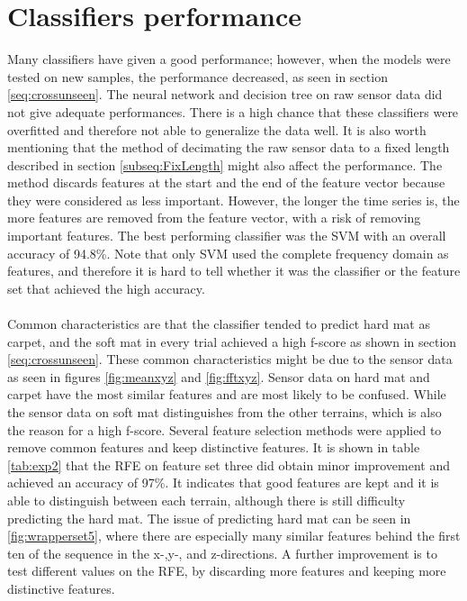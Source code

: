 \documentclass[USenglish]{ifimaster}  %
\begin{document}
\section{Classifiers performance}
Many classifiers have given a good performance; however, when the models were tested on new samples, the performance decreased, as seen in section \ref{seq:crossunseen}. The neural network and decision tree on raw sensor data did not give adequate performances. There is a high chance that these classifiers were overfitted and therefore not able to generalize the data well. It is also worth mentioning that the method of decimating the raw sensor data to a fixed length described in section \ref{subseq:FixLength} might also affect the performance. The method discards features at the start and the end of the feature vector because they were considered as less important. However, the longer the time series is, the more features are removed from the feature vector, with a risk of removing important features. The best performing classifier was the SVM with an overall accuracy of 94.8\%. Note that only SVM used the complete frequency domain as features, and therefore it is hard to tell whether it was the classifier or the feature set that achieved the high accuracy.  
\\
\\
Common characteristics are that the classifier tended to predict hard mat as carpet, and the soft mat in every trial achieved a high f-score as shown in section \ref{seq:crossunseen}. These common characteristics might be due to the sensor data as seen in figures \ref{fig:meanxyz} and \ref{fig:fftxyz}. Sensor data on hard mat and carpet have the most similar features and are most likely to be confused. While the sensor data on soft mat distinguishes from the other terrains, which is also the reason for a high f-score. Several feature selection methods were applied to remove common features and keep distinctive features. It is shown in table \ref{tab:exp2} that the RFE on feature set three did obtain minor improvement and achieved an accuracy of 97\%. It indicates that good features are kept and it is able to distinguish between each terrain, although there is still difficulty predicting the hard mat. The issue of predicting hard mat can be seen in \ref{fig:wrapperset5}, where there are especially many similar features behind the first ten of the sequence in the x-,y-, and z-directions. A further improvement is to test different values on the RFE, by discarding more features and keeping more distinctive features.
	
\end{document}
